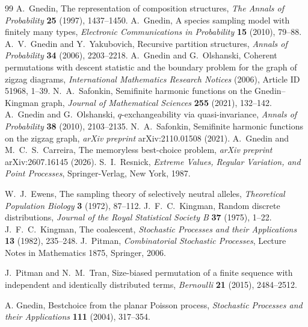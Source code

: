 \documentclass[11pt]{article}
\theoremstyle{plain}
\theoremstyle{definition}
\begin{document}
\begin{thebibliography}{99}
A.~Gnedin, The representation of composition structures, \emph{The Annals of Probability} \textbf{25} (1997), 1437--1450.
A.~Gnedin, A species sampling model with finitely many types, \emph{Electronic Communications in Probability} \textbf{15} (2010), 79--88.
A.~V.~Gnedin and Y.~Yakubovich, Recursive partition structures, \emph{Annals of Probability} \textbf{34} (2006), 2203--2218.
A.~Gnedin and G.~Olshanski, Coherent permutations with descent statistic and the boundary problem for the graph of zigzag diagrams, \emph{International Mathematics Research Notices} (2006), Article ID 51968, 1--39.
 N.~A.~Safonkin, Semifinite harmonic functions on the Gnedin--Kingman graph, \emph{Journal of Mathematical Sciences} \textbf{255} (2021), 132--142.
 A.~Gnedin and G.~Olshanski, \(q\)-exchangeability via quasi-invariance, \emph{Annals of Probability} \textbf{38} (2010), 2103--2135.
 N.~A.~Safonkin, Semifinite harmonic functions on the zigzag graph, \emph{arXiv preprint} arXiv:2110.01508 (2021).
 A.~Gnedin and M.~C.~S.~Carreira, The memoryless best-choice problem, \emph{arXiv preprint} arXiv:2607.16145 (2026).
S.~I.~Resnick,
\emph{Extreme Values, Regular Variation, and Point Processes},
Springer-Verlag, New York, 1987.

 W.~J.~Ewens, The sampling theory of selectively neutral alleles, \emph{Theoretical Population Biology} \textbf{3} (1972), 87--112.
 J.~F.~C.~Kingman, Random discrete distributions, \emph{Journal of the Royal Statistical Society B} \textbf{37} (1975), 1--22.
 J.~F.~C.~Kingman, The coalescent, \emph{Stochastic Processes and their Applications} \textbf{13} (1982), 235--248.
 J.~Pitman, \emph{Combinatorial Stochastic Processes}, Lecture Notes in Mathematics 1875, Springer, 2006.

 J.~Pitman and N.~M.~Tran, Size-biased permutation of a finite sequence with independent and identically distributed terms, \emph{Bernoulli} \textbf{21} (2015), 2484--2512.

 A. Gnedin, Bestchoice from the planar Poisson process, \emph{Stochastic Processes and their Applications} \textbf{111} (2004), 317--354.





\end{thebibliography}
\end{document}
